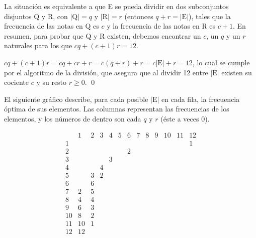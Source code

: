 		La situación es equivalente a que E se pueda dividir en dos subconjuntos disjuntos Q y R, con $|\text{Q}|=q$ y $|\text{R}|=r$ (entonces $q+r=|\text{E}|$), tales que la frecuencia de las notas en Q es $c$ y la frecuencia de las notas en R es $c+1$. En resumen, para probar que Q y R existen, debemos encontrar un $c$, un $q$ y un $r$ naturales para los que $cq + (c+1)r=12$.
		
		$cq + (c+1)r =
		cq + cr + r =
		c(q+r) + r =
		c|\text{E}| + r = 12$, lo cual se cumple por el algoritmo de la división, que asegura que al dividir 12 entre $|\text{E}|$ existen su cociente $c$ y su resto $r\geq0$. \qed
		
		El siguiente gráfico describe, para cada posible $|\text{E}|$ en cada fila, la frecuencia óptima de sus elementos. Las columnas representan las frecuencias de los elementos, y los números de dentro son cada $q$ y $r$ (éste a veces 0).
		
		
%			
%			
%			
	
		$$\begin{array}{l|rrrrrrrrrrrr}
		&1&2&3&4&5&6&7&8&9&10&11&12\\\hline
		1&&&&&&&&&&&&1\\\hline
		2&&&&&&2\\\hline
		3&&&&3\\\hline
		4&&&4\\\hline
		5&&3&2\\\hline
		6&&6\\\hline
		7&2&5\\\hline
		8&4&4\\\hline
		9&6&3\\\hline
		10&8&2\\\hline
		11&10&1\\\hline
		12&12&\\
		\end{array}$$
		
